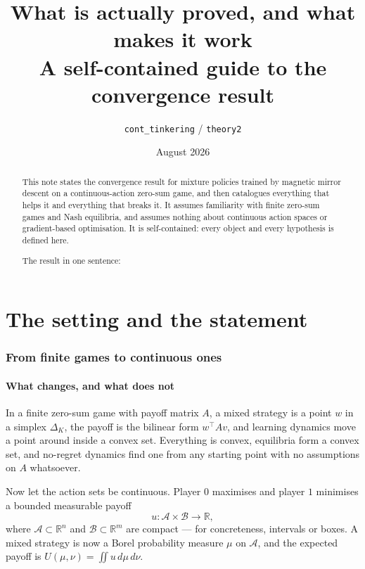 \documentclass[11pt]{article}
\title{What is actually proved, and what makes it work\\
  \large A self-contained guide to the convergence result}
\author{\texttt{cont\_tinkering} / \texttt{theory2}}
\date{August 2026}
\theoremstyle{definition}
\newcommand{\R}{\mathbb{R}}
\newcommand{\cA}{\mathcal{A}}
\newcommand{\cB}{\mathcal{B}}
\begin{document}
\maketitle

\begin{abstract}
\noindent
This note states the convergence result for mixture policies trained by magnetic
mirror descent on a continuous-action zero-sum game, and then catalogues
everything that helps it and everything that breaks it. It assumes familiarity
with finite zero-sum games and Nash equilibria, and assumes nothing about
continuous action spaces or gradient-based optimisation. It is self-contained:
every object and every hypothesis is defined here.

\medskip
\noindent
The result in one sentence:

\medskip
\noindent{}
\end{abstract}

\tableofcontents

\part{The setting and the statement}

\section{From finite games to continuous ones}

\subsection*{What changes, and what does not}

In a finite zero-sum game with payoff matrix $A$, a mixed strategy is a point
$w$ in a simplex $\Delta_K$, the payoff is the bilinear form $w^\top A v$, and
learning dynamics move a point around inside a convex set. Everything is convex,
equilibria form a convex set, and no-regret dynamics find one from any starting
point with no assumptions on $A$ whatsoever.

Now let the action sets be continuous. Player $0$ maximises and player $1$
minimises a bounded measurable payoff
\[
  u : \cA \times \cB \to \R,
\]
where $\cA \subset \R^{n}$ and $\cB \subset \R^{m}$ are compact --- for
concreteness, intervals or boxes. A mixed strategy is now a Borel probability
measure $\mu$ on $\cA$, and the expected payoff is
$U(\mu,\nu) = \iint u \, d\mu \, d\nu$.
\end{document}
